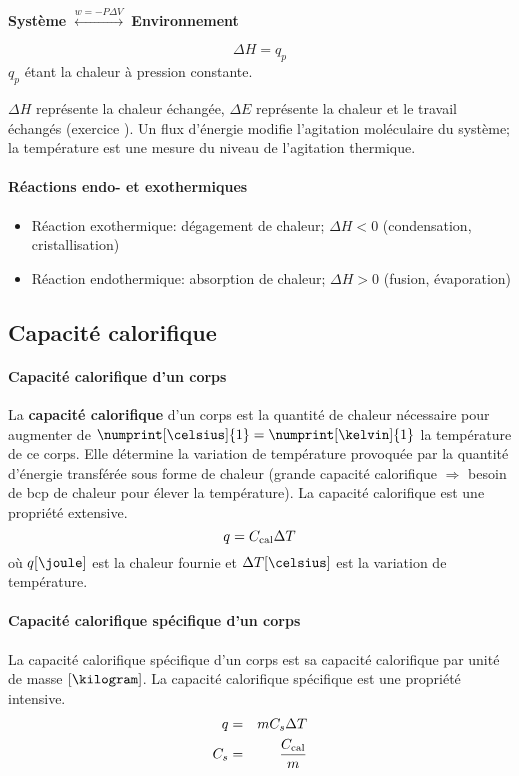\textbf{Système} $\stackrel{w=-P\Delta V}{\longleftrightarrow}$ \textbf{Environnement}

$$\Delta H=q_p$$ $q_p$ étant la chaleur à pression constante.

$\Delta H$ représente la chaleur échangée,
$\Delta E$ représente la chaleur et le travail échangés (exercice \cite[p.~10]{legras}).
Un flux d'énergie modifie l'agitation moléculaire du système; la température est une mesure du niveau de l'agitation thermique.

\paragraph{Réactions endo- et exothermiques}
\begin{itemize}
  \item Réaction exothermique: dégagement de chaleur; $\Delta H<0$ (condensation, cristallisation)
  \item Réaction endothermique: absorption de chaleur; $\Delta H>0$ (fusion, évaporation)
\end{itemize}

\subsection{Capacité calorifique}
\paragraph{Capacité calorifique d'un corps} \label{sec:C_cal}
La \textbf{capacité calorifique} d'un corps est la quantité de chaleur nécessaire pour augmenter de $\numprint[\celsius]{1} = \numprint[\kelvin]{1}$ la température de ce corps.
Elle détermine la variation de température provoquée par la quantité d'énergie transférée sous forme de chaleur (grande capacité calorifique $\Rightarrow$ besoin de bcp de chaleur pour élever la température).
La capacité calorifique est une propriété extensive.
\[ q = C_\mathrm{cal} \Delta T \]
où $q[\joule]$ est la chaleur fournie et $\Delta T[\celsius]$ est la variation de température.

\paragraph{Capacité calorifique spécifique d'un corps} \label{sec:C_s}
La capacité calorifique spécifique d'un corps est sa capacité calorifique par unité de masse $[\kilogram]$.
La capacité calorifique spécifique est une propriété intensive.
\begin{eqnarray*}
  q &=& m C_s \Delta T\\
  C_s &=& \frac{C_\mathrm{cal}}{m}
\end{eqnarray*}


